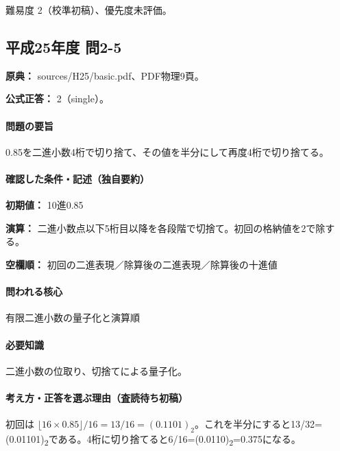 \par 難易度 2（校準初稿）、優先度未評価。

\subsection{平成25年度 問2-5}
\label{q:h25-reg-basic-2-5}

\noindent\textbf{原典：} sources/H25/basic.pdf、PDF物理9頁。

\textbf{公式正答：} 2（single）。

\paragraph{問題の要旨} 0.85を二進小数4桁で切り捨て、その値を半分にして再度4桁で切り捨てる。

\paragraph{確認した条件・記述（独自要約）}\mbox{}\par

\noindent\textbf{初期値：} 10進0.85\par

\noindent\textbf{演算：} 二進小数点以下5桁目以降を各段階で切捨て。初回の格納値を2で除する。\par

\noindent\textbf{空欄順：} 初回の二進表現／除算後の二進表現／除算後の十進値\par

\paragraph{問われる核心} 有限二進小数の量子化と演算順

\paragraph{必要知識} 二進小数の位取り、切捨てによる量子化。

\paragraph{考え方・正答を選ぶ理由（査読待ち初稿）} 初回は \(\lfloor16\times0.85\rfloor/16=13/16=(0.1101)_2\)。これを半分にすると13/32=\allowbreak{}(0.01101)\textsubscript{2}である。4桁に切り捨てると6/16=\allowbreak{}(0.0110)\textsubscript{2}=0.375になる。

